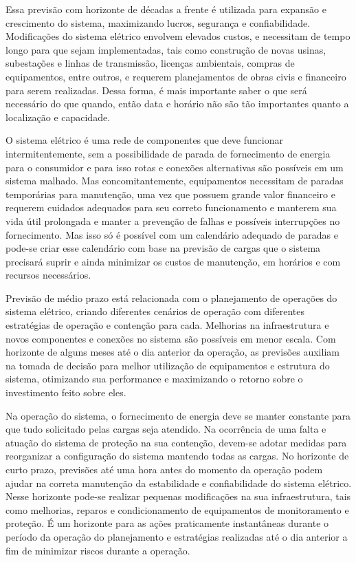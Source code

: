 \documentclass[
	12pt,				%
	oneside,			%
	a4paper,			%
	english,			%
	brazil				%
	]{abntex2}
\begin{document}
	Essa previsão com horizonte de décadas a frente é utilizada para expansão e crescimento do sistema, maximizando lucros, segurança e confiabilidade. Modificações do sistema elétrico envolvem elevados custos, e necessitam de tempo longo para que sejam implementadas, tais como construção de novas usinas, subestações e linhas de transmissão, licenças ambientais, compras de equipamentos, entre outros, e requerem planejamentos de obras civis e financeiro para serem realizadas.  	
	Dessa forma, é mais importante saber o que será necessário do que quando, então data e horário não são tão importantes quanto a localização e capacidade. 	
	
	O sistema elétrico é uma rede de componentes que deve funcionar intermitentemente, sem a possibilidade de parada de fornecimento de energia para o consumidor e para isso rotas e conexões alternativas são possíveis em um sistema malhado. Mas concomitantemente, equipamentos necessitam de paradas temporárias para manutenção, uma vez que possuem grande valor financeiro e requerem cuidados adequados para seu correto funcionamento e manterem sua vida útil prolongada e manter a prevenção de falhas e possíveis interrupções no fornecimento. Mas isso só é possível com um calendário adequado de paradas e pode-se criar esse calendário com base na previsão de cargas que o sistema precisará suprir e ainda minimizar os custos de manutenção, em horários e com recursos necessários. 
	
	Previsão de médio prazo está relacionada com o planejamento de operações do sistema elétrico, criando diferentes cenários de operação com diferentes estratégias de operação e contenção para cada. Melhorias na infraestrutura e novos componentes e conexões no sistema são possíveis em menor escala. Com horizonte de alguns meses até o dia anterior da operação, as previsões auxiliam na tomada de decisão para melhor utilização de equipamentos e estrutura do sistema, otimizando sua performance e maximizando o retorno sobre o investimento feito sobre eles. 
	
	Na operação do sistema, o fornecimento de energia deve se manter constante para que tudo solicitado pelas cargas seja atendido. Na ocorrência de uma falta e atuação do sistema de proteção na sua contenção, devem-se adotar medidas para reorganizar a configuração do sistema mantendo todas as cargas. No horizonte de curto prazo, previsões até uma hora antes do momento da operação podem ajudar na correta manutenção da estabilidade e confiabilidade do sistema elétrico. Nesse horizonte pode-se realizar pequenas modificações na sua infraestrutura, tais como melhorias, reparos e condicionamento de equipamentos de monitoramento e proteção. É um horizonte para as ações praticamente instantâneas durante o período da operação do planejamento e estratégias realizadas até o dia anterior a fim de minimizar riscos durante a operação. 
	
\end{document}
